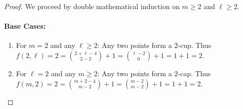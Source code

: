\documentclass[11pt,a4paper]{article}
\theoremstyle{definition}
\begin{document}
\begin{proof}
We proceed by double mathematical induction on $m \ge 2$ and $\ell \ge 2$.

\paragraph{Base Cases:}
\begin{enumerate}
    \item For $m = 2$ and any $\ell \ge 2$: Any two points form a $2$-cup.
    Thus $f(2, \ell) = 2 = \binom{2 + \ell - 4}{2 - 2} + 1 = \binom{\ell - 2}{0} + 1 = 1 + 1 = 2$.
    \item For $\ell = 2$ and any $m \ge 2$: Any two points form a $2$-cap.
    Thus $f(m, 2) = 2 = \binom{m + 2 - 4}{m - 2} + 1 = \binom{m - 2}{m - 2} + 1 = 1 + 1 = 2$.
\end{enumerate}


\end{proof}
\end{document}
